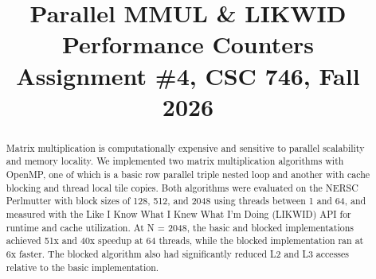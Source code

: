 \documentclass[11pt,final,conference]{IEEEtran}
\begin{document}
\thispagestyle{plain}
\pagestyle{plain}



\title{Parallel MMUL \& LIKWID Performance Counters \\Assignment \#4, CSC 746, Fall 2026}

\author{
}

\maketitle

\begin{abstract}
Matrix multiplication is computationally expensive and sensitive to parallel scalability and memory locality. We implemented two matrix multiplication algorithms with OpenMP, one of which is a basic row parallel triple nested loop and another with cache blocking and thread local tile copies. Both algorithms were evaluated on the NERSC Perlmutter with block sizes of 128, 512, and 2048 using threads between 1 and 64, and measured with the Like I Know What I Knew What I'm Doing (LIKWID) API for runtime and cache utilization. At N = 2048, the basic and blocked implementations achieved 51x and 40x speedup at 64 threads, while the blocked implementation ran at 6x faster. The blocked algorithm also had significantly reduced L2 and L3 accesses relative to the basic implementation.
\end{abstract}



% 





%

%
%
%

\nocite{*}

\end{document}
